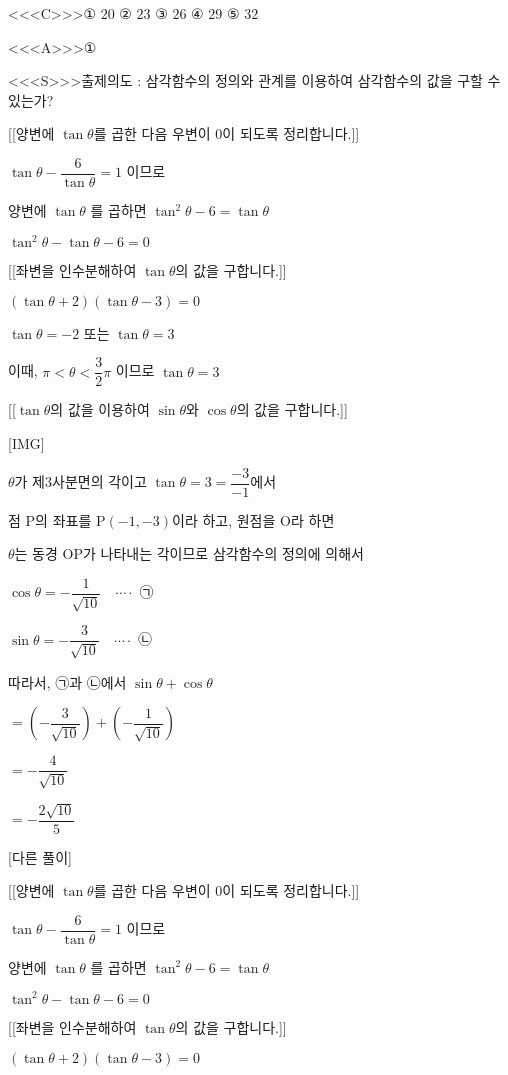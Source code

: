 \documentclass{oblivoir}
\begin{document}
<<<C>>>① $20$
② $23$
③ $26$
④ $29$
⑤ $32$

<<<A>>>①

<<<S>>>출제의도 : 삼각함수의 정의와 관계를 이용하여 삼각함수의 값을 구할 수 있는가?

[[양변에 $\tan \theta$를 곱한 다음 우변이 $0$이 되도록 정리합니다.]]

$\tan \theta-\dfrac{6}{\tan \theta}=1$ 이므로

양변에 $\tan \theta$ 를 곱하면
$\tan ^{2} \theta-6=\tan \theta$

$\tan ^{2} \theta-\tan \theta-6=0$

[[좌변을 인수분해하여 $\tan \theta$의 값을 구합니다.]]

$(\tan \theta+2)(\tan \theta-3)=0$

$\tan \theta=-2$ 또는 $\tan \theta=3$

이때, $\pi<  \theta<  \dfrac{3}{2} \pi$ 이므로
$\tan \theta=3$

[[$\tan \theta$의 값을 이용하여 $\sin \theta$와 $\cos \theta$의 값을 구합니다.]]

[IMG]

$\theta$가 제$3$사분면의 각이고 $\tan \theta=3 = \dfrac{-3}{-1}$에서

점 $\mathrm{P}$의 좌표를 $\mathrm{P}(-1,-3)$이라 하고, 원점을 $\mathrm{O}$라 하면

$\theta$는 동경 $\mathrm{OP}$가 나타내는 각이므로 삼각함수의 정의에 의해서 

$\cos \theta=-\dfrac{1}{\sqrt{10}} \quad \cdots \cdot$ ㉠

$\sin \theta=-\dfrac{3}{\sqrt{10}} \quad \cdots \cdot$ ㉡

따라서, ㉠과 ㉡에서 $\sin \theta+\cos \theta$

$=\left(-\dfrac{3}{\sqrt{10}}\right)+\left(-\dfrac{1}{\sqrt{10}}\right)$

$=-\dfrac{4}{\sqrt{10}}$

$=-\dfrac{2 \sqrt{10}}{5}$

[다른 풀이]

[[양변에 $\tan \theta$를 곱한 다음 우변이 $0$이 되도록 정리합니다.]]

$\tan \theta-\dfrac{6}{\tan \theta}=1$ 이므로

양변에 $\tan \theta$ 를 곱하면
$\tan ^{2} \theta-6=\tan \theta$

$\tan ^{2} \theta-\tan \theta-6=0$

[[좌변을 인수분해하여 $\tan \theta$의 값을 구합니다.]]

$(\tan \theta+2)(\tan \theta-3)=0$
\end{document}
